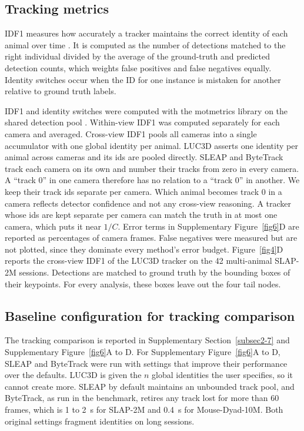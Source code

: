 \documentclass[pdflatex, sn-nature]{sn-jnl}
\theoremstyle{thmstyleone}%
\theoremstyle{thmstyletwo}%
\theoremstyle{thmstylethree}%
\begin{document}
\subsection{Tracking metrics}\label{methods-tracking}

IDF1 measures how accurately a tracker maintains the correct identity of each animal over time \citep{Ristani2016}. It is computed as the number of detections matched to the right individual divided by the average of the ground-truth and predicted detection counts, which weights false positives and false negatives equally. Identity switches occur when the ID for one instance is mistaken for another relative to ground truth labels.

IDF1 and identity switches were computed with the motmetrics library on the shared detection pool \citep{Bernardin2008, Heindl2024}. Within-view IDF1 was computed separately for each camera and averaged. Cross-view IDF1 pools all cameras into a single accumulator with one global identity per animal. LUC3D asserts one identity per animal across cameras and its ids are pooled directly. SLEAP and ByteTrack track each camera on its own and number their tracks from zero in every camera. A ``track 0'' in one camera therefore has no relation to a ``track 0'' in another. We keep their track ids separate per camera. Which animal becomes track 0 in a camera reflects detector confidence and not any cross-view reasoning. A tracker whose ids are kept separate per camera can match the truth in at most one camera, which puts it near $1/C$. Error terms in Supplementary Figure~\ref{fig6}D are reported as percentages of camera frames. False negatives were measured but are not plotted, since they dominate every method's error budget. Figure~\ref{fig4}D reports the cross-view IDF1 of the LUC3D tracker on the 42 multi-animal SLAP-2M sessions. Detections are matched to ground truth by the bounding boxes of their keypoints. For every analysis, these boxes leave out the four tail nodes.

\subsection{Baseline configuration for tracking comparison}\label{methods-baseline}

The tracking comparison is reported in Supplementary Section~\ref{subsec2-7} and Supplementary Figure~\ref{fig6}A to D. For Supplementary Figure~\ref{fig6}A to D, SLEAP and ByteTrack were run with settings that improve their performance over the defaults. LUC3D is given the $n$ global identities the user specifies, so it cannot create more. SLEAP by default maintains an unbounded track pool, and ByteTrack, as run in the benchmark, retires any track lost for more than 60 frames, which is 1 to 2~s for SLAP-2M and 0.4~s for Mouse-Dyad-10M. Both original settings fragment identities on long sessions.
\end{document}
